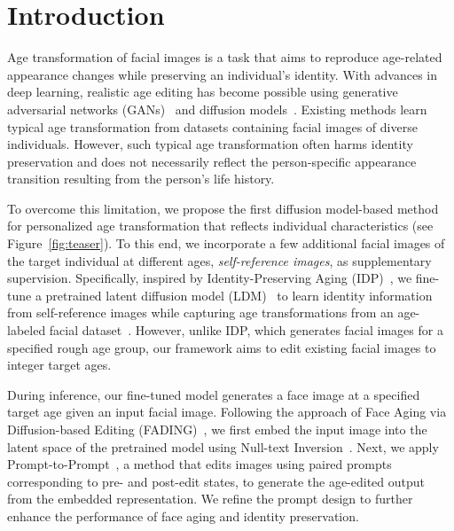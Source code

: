 
\section{Introduction}
Age transformation of facial images is a task that aims to reproduce age-related appearance changes while preserving an individual's identity.
With advances in deep learning, realistic age editing has become possible using generative adversarial networks (GANs)~\cite{or2020lifespan,alaluf2021only,gomez2022custom} and diffusion models~\cite{li2023pluralistic,chen2023face}.
Existing methods learn typical age transformation from datasets containing facial images of diverse individuals. However, such typical age transformation often harms identity preservation and does not necessarily reflect the person-specific appearance transition resulting from the person's life history. 

To overcome this limitation, we propose the first diffusion model-based method for personalized age transformation that reflects individual characteristics (see Figure~\ref{fig:teaser}). To this end, we incorporate a few additional facial images of the target individual at different ages, \textit{self-reference images}, as supplementary supervision.
Specifically, inspired by Identity-Preserving Aging (IDP)~\cite{banerjee2023identity}, we fine-tune a pretrained latent diffusion model (LDM)~\cite{rombach2022high} to learn identity information from self-reference images while capturing age transformations from an age-labeled facial dataset~\cite{jiang2021talk}. 
However, unlike IDP, which generates facial images for a specified rough age group, our framework aims to edit existing facial images to integer target ages. 

During inference, our fine-tuned model generates a face image at a specified target age given an input facial image. 
Following the approach of Face Aging via Diffusion-based Editing (FADING)~\cite{chen2023face}, we first embed the input image into the latent space of the pretrained model using Null-text Inversion~\cite{mokady2023null}.
Next, we apply Prompt-to-Prompt~\cite{hertz2022prompt}, a method that edits images using paired prompts corresponding to pre- and post-edit states, to generate the age-edited output from the embedded representation.
We refine the prompt design to further enhance the performance of face aging and identity preservation. 

